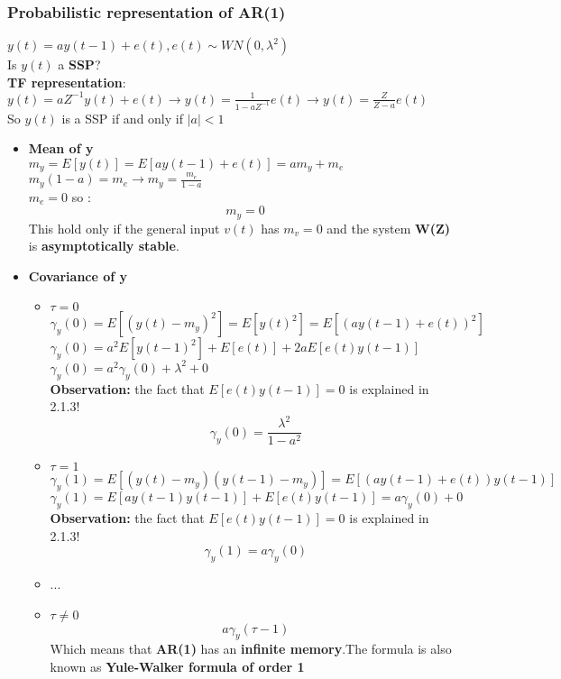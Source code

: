 \subsubsection{Probabilistic representation of AR(1)}
$y(t) = ay(t-1)+e(t) , e(t) \sim WN(0,\lambda^2)$ \\
Is $y(t)$ a \textbf{SSP}?\\
\textbf{TF representation}:\\
$ y(t) = aZ^{-1}y(t)+e(t) \to y(t) = \frac{1}{1-aZ^{-1}}e(t) \to y(t)=\frac{Z}{Z-a}e(t) $\\
So  $y(t)$ is a SSP if and only if $|a|<1$
\begin{itemize}
\item \textbf{Mean of y}\\
$m_y = E[y(t)] = E[ay(t-1)+e(t)] = am_y + m_e $ \\ 
$m_y(1-a) = m_e  \to m_y = \frac{m_e}{1-a} $ \\ 
$m_e = 0$ so : \\
\[
\boxed{m_y = 0}
\] 
This hold only if the general input $v(t)$ has $m_v = 0$ and the system \textbf{W(Z)} is \textbf{asymptotically stable}.
\item \textbf{Covariance of y}\\
\begin{itemize}
\item $\tau=0$\\
$ \gamma_y(0) = E[(y(t) -m_y)^2] = E[y(t)^2] = E[(ay(t-1)+e(t))^2]$\\
$ \gamma_y(0) = a^2E[y(t-1)^2]+E[e(t)]+2aE[e(t)y(t-1)]$ \\
$ \gamma_y(0) = a^2\gamma_y(0) + \lambda^2 + 0 $ \\
\textbf{Observation: } the fact that $E[e(t)y(t-1)] = 0$ is explained in 2.1.3! \\
\[
\boxed{\gamma_y(0) = \frac{\lambda^2}{1-a^2}}
\]
\item $\tau = 1$\\
$ \gamma_y(1) = E[(y(t)-m_y)(y(t-1)-m_y)] = E[(ay(t-1)+e(t))y(t-1)]$ \\
$ \gamma_y(1) = E[ay(t-1)y(t-1)] + E[e(t)y(t-1)] = a\gamma_y(0) + 0$ \\
\textbf{Observation: } the fact that $E[e(t)y(t-1)] = 0$ is explained in 2.1.3! \\
\[
\boxed{\gamma_y(1) = a\gamma_y(0)}
\]
\item ...\\
\item $\tau \neq 0$\\
\[
\boxed{a\gamma_y(\tau-1)}
\]
Which means that \textbf{AR(1)} has an \textbf{infinite memory}.The formula is also known as \textbf{Yule-Walker formula of order 1}
\end{itemize}
\end{itemize}
